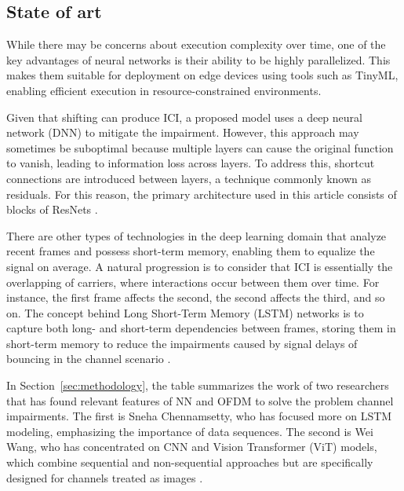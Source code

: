\subsection{State of art}

While there may be concerns about execution complexity over time, one of the key advantages of neural networks is their ability to be highly parallelized. This makes them suitable for deployment on edge devices using tools such as TinyML, enabling efficient execution in resource-constrained environments.

Given that shifting can produce ICI, a proposed model uses a deep neural network (DNN) to mitigate the impairment. However, this approach may sometimes be suboptimal because multiple layers can cause the original function to vanish, leading to information loss across layers. To address this, shortcut connections are introduced between layers, a technique commonly known as residuals. For this reason, the primary architecture used in this article consists of blocks of ResNets \cite{9723316}.

There are other types of technologies in the deep learning domain that analyze recent frames and possess short-term memory, enabling them to equalize the signal on average. A natural progression is to consider that ICI is essentially the overlapping of carriers, where interactions occur between them over time. For instance, the first frame affects the second, the second affects the third, and so on. The concept behind Long Short-Term Memory (LSTM) networks is to capture both long- and short-term dependencies between frames, storing them in short-term memory to reduce the impairments caused by signal delays of bouncing in the channel scenario \cite{10244541}.

In Section~\ref{sec:methodology}, the table summarizes the work of two researchers that has found relevant features of NN and OFDM to solve the problem channel impairments. The first is Sneha Chennamsetty, who has focused more on LSTM modeling, emphasizing the importance of data sequences\cite{chennamsetty2024beyond}\cite{10331412}\cite{10391945}\cite{10041313}. The second is Wei Wang, who has concentrated on CNN and Vision Transformer (ViT) models, which combine sequential and non-sequential approaches but are specifically designed for channels treated as images \cite{10359437}\cite{10246306}\cite{9095223}.
